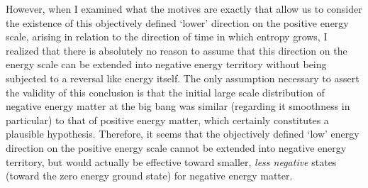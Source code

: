 \documentclass[notitlepage,12pt]{report}
\begin{document}
However, when I examined what the motives are exactly that allow us to consider the existence of this objectively defined `lower' direction on the positive energy scale, arising in relation to the direction of time in which entropy grows, I realized that there is absolutely no reason to assume that this direction on the energy scale can be extended into negative energy territory without being subjected to a reversal like energy itself. The only assumption necessary to assert the validity of this conclusion is that the initial large scale distribution of negative energy matter at the big bang was similar (regarding it smoothness in particular) to that of positive energy matter, which certainly constitutes a plausible hypothesis. Therefore, it seems that the objectively defined `low' energy direction on the positive energy scale cannot be extended into negative energy territory, but would actually be effective toward smaller, \textit{less negative} states (toward the zero energy ground state) for negative energy matter.
\end{document}
